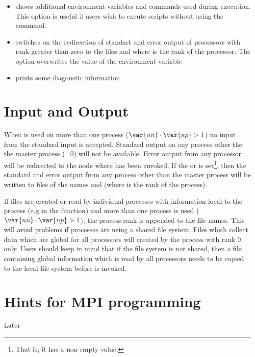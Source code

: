 \begin{itemize}
 \item[\programopt{-e}] shows additional environment variables and commands used during  execution. This option is useful if users wish to excute scripts without using the  command.

 \item[\programopt{-o}] switches on the redirection of standart and error output of processors with \MPI rank greater than zero to the files  and  where  is the rank of the processor. The option overwrites the value of the  environment variable 


 \item[\programopt{-v}] prints some diagonstic information.
\end{itemize}

\section{Input and Output}
When \MPI is used on more than one process ($\var{nn} \cdot \var{np} >1$) no input from the standard input is accepted. Standard output on any process other the the master process (=0) will not be available.
Error output from any processor will be redirected to the node where  has been envoked.
If the  or  is set\footnote{That is, it has a non-empty value.}, then the standard and error output from any process other than the master process will be written to files of the names  and  (where 
 is the rank of the process).

If files are created or read by individual \MPI processes with information local to the process (e.g in the  function)  and more than one process is used ($\var{nn} \cdot \var{np} >1$), the \MPI process rank is appended to the file names.
This will avoid problems if processes are using a shared file system.
Files which collect data which are global for all \MPI processors will created by the process with \MPI rank 0 only.
Users should keep in mind that if the file system is not shared, then a file containing global information
which is read by all processors needs to be copied to the local file system before  is invoked.
 

\section{Hints for MPI programming}
Later